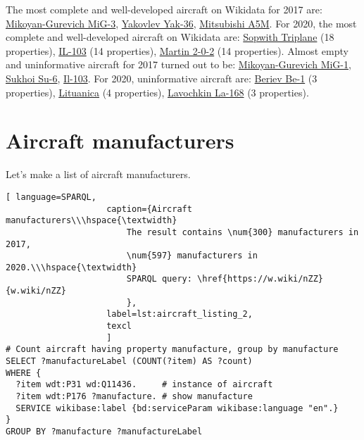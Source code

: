The most complete and well-developed aircraft on Wikidata for 2017 are: \href{https://www.wikidata.org/wiki/Q271446}{Mikoyan-Gurevich MiG-3}, 
\href{https://www.wikidata.org/wiki/Q1349098}{Yakovlev Yak-36}, \href{https://www.wikidata.org/wiki/Q429839}{Mitsubishi A5M}. 
For 2020, the most complete and well-developed aircraft on Wikidata are: \href{https://www.wikidata.org/wiki/Q770863}{Sopwith Triplane} (18 properties), 
\href{https://www.wikidata.org/wiki/Q1658673}{IL-103} (14 properties), \href{https://www.wikidata.org/wiki/Q665071}{Martin 2-0-2} (14 properties).
Almost empty and uninformative aircraft for 2017 turned out to be: \href{https://www.wikidata.org/wiki/Q464247}{Mikoyan-Gurevich MiG-1}, 
\href{https://www.wikidata.org/wiki/Q2296502}{Sukhoi Su-6}, \href{https://www.wikidata.org/wiki/Q1658673}{Il-103}.
For 2020, uninformative aircraft are: \href{https://www.wikidata.org/wiki/Q820603}{Beriev Be-1} (3 properties), \href{https://www.wikidata.org/wiki/Q117984}{Lituanica} (4 properties), 
\href{https://www.wikidata.org/wiki/Q572762}{Lavochkin La-168} (3 properties).


\section{Aircraft manufacturers}

Let's make a list of aircraft manufacturers.

\begin{lstlisting}[ language=SPARQL, 
                    caption={Aircraft manufacturers\\\hspace{\textwidth}
                        The result contains \num{300} manufacturers in 2017, 
                        \num{597} manufacturers in 2020.\\\hspace{\textwidth}
                        SPARQL query: \href{https://w.wiki/nZZ}{w.wiki/nZZ}
                        },
                    label=lst:aircraft_listing_2,
                    texcl 
                    ]
# Count aircraft having property manufacture, group by manufacture
SELECT ?manufactureLabel (COUNT(?item) AS ?count) 
WHERE {
  ?item wdt:P31 wd:Q11436.     # instance of aircraft
  ?item wdt:P176 ?manufacture. # show manufacture
  SERVICE wikibase:label {bd:serviceParam wikibase:language "en".}
}
GROUP BY ?manufacture ?manufactureLabel 
\end{lstlisting}

